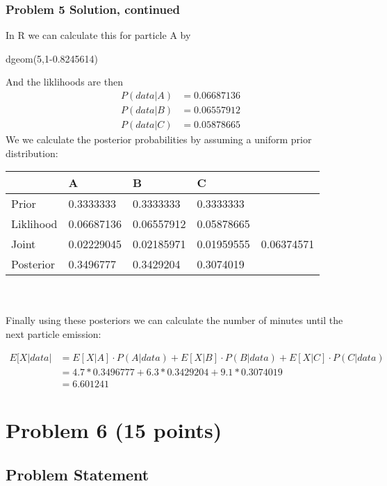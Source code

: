 \documentclass[12pt]{article}
\theoremstyle{definition}
\begin{document}
\newpage
\subsubsection*{Problem 5 Solution, continued}
In R we can calculate this for particle A by
\begin{verbatim*}
dgeom(5,1-0.8245614)
\end{verbatim*}
And the liklihoods are then
\begin{align*}
P(data|A) &= 0.06687136\\
P(data|B) &= 0.06557912\\
P(data|C) &= 0.05878665
\end{align*}
We we calculate the posterior probabilities by assuming a uniform prior distribution:

\begin{tabular}{lllll}
&   A   &   B   &   C   \\
\hline
Prior      &   0.3333333   &   0.3333333   &   0.3333333   &\\
Liklihood  &   0.06687136   &   0.06557912   &   0.05878665   &\\
Joint      &   0.02229045   &   0.02185971   &   0.01959555   &   0.06374571\\
Posterior  &   0.3496777   &   0.3429204   &   0.3074019   &\\
\hline
\end{tabular}
\\\\
Finally using these posteriors we can calculate the number of minutes until the next particle emission:

\begin{align*}
E[X|data| &= E[X|A] \cdot P(A|data) + E[X|B] \cdot P(B|data) + E[X|C] \cdot P(C|data)\\
&= 4.7 * 0.3496777 + 6.3 * 0.3429204 + 9.1 * 0.3074019\\
&= 6.601241
\end{align*}


\newpage
\section*{Problem 6 (15 points)}

\subsection*{Problem Statement}
\end{document}
